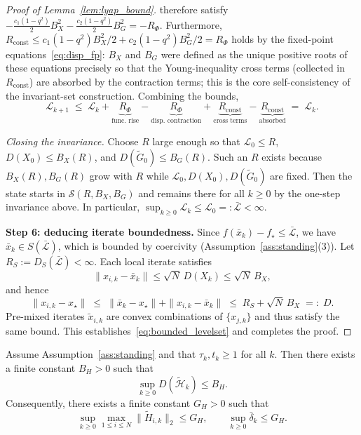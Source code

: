 \documentclass[review,onefignum,onetabnum]{siamart171218}
\begin{document}
\begin{proof}[Proof of Lemma~\ref{lem:lyap_bound}]
therefore satisfy
$-\tfrac{c_1(1{-}q^2)}{2}B_X^2-\tfrac{c_2(1{-}q^2)}{2}B_G^2
=-R_\Phi$.
Furthermore, $R_{\mathrm{const}}\le c_1(1{-}q^2)B_X^2/2+c_2(1{-}q^2)B_G^2/2=R_\Phi$
holds by the fixed-point equations~\eqref{eq:disp_fp}:
$B_X$ and $B_G$ were defined as the unique positive roots of these
equations precisely so that the Young-inequality cross terms (collected
in $R_{\mathrm{const}}$) are absorbed by the contraction terms;
this is the core self-consistency of the invariant-set construction.
Combining the bounds,
\[
  \mathcal L_{k+1}
  \;\le\;
  \mathcal L_k
  +\underbrace{R_\Phi}_{\text{func.\ rise}}
  -\underbrace{R_\Phi}_{\text{disp.\ contraction}}
  +\underbrace{R_{\mathrm{const}}}_{\text{cross terms}}
  -\underbrace{R_{\mathrm{const}}}_{\text{absorbed}}
  \;=\; \mathcal L_k.
\]

\emph{Closing the invariance.}
Choose $R$ large enough so that
$\mathcal L_0\le R$,
$D(X_0)\le B_X(R)$, and
$D(\tilde G_0)\le B_G(R)$.
Such an $R$ exists because $B_X(R),B_G(R)$ grow with $R$
while $\mathcal L_0,D(X_0),D(\tilde G_0)$ are fixed.
Then the state starts in $\mathcal S(R,B_X,B_G)$
and remains there for all $k\ge0$ by the one-step invariance above.
In particular, $\sup_{k\ge0}\mathcal L_k\le \mathcal L_0=:\bar{\mathcal L}<\infty$.

\smallskip
\noindent\textbf{Step 6: deducing iterate boundedness.}
Since $f(\bar x_k)-f_\star\le\bar{\mathcal L}$, we have
$\bar x_k\in S(\bar{\mathcal L})$,
which is bounded by coercivity (Assumption~\ref{ass:standing}(3)).
Let $R_S:=D_S(\bar{\mathcal L})<\infty$.
Each local iterate satisfies
\[
  \|x_{i,k}-\bar x_k\|\le\sqrt{N}\,D(X_k)\le\sqrt{N}\,B_X,
\]
and hence
\[
  \|x_{i,k}-x_\star\|
  \;\le\;
  \|\bar x_k-x_\star\|+\|x_{i,k}-\bar x_k\|
  \;\le\;
  R_S + \sqrt{N}\,B_X
  \;=:\; D.
\]
Pre-mixed iterates $\tilde x_{i,k}$ are convex combinations of
$\{x_{j,k}\}$ and thus satisfy the same bound.
This establishes~\eqref{eq:bounded_levelset} and completes the proof.
\end{proof}

\begin{lemma}\label{lem:tilde_hess_bounded}
Assume Assumption~\ref{ass:standing} and that $\tau_k,t_k\ge 1$ for all $k$.
Then there exists a finite constant $B_H>0$ such that
\[
\sup_{k\ge 0} D(\tilde{\mathcal H}_k)\le B_H.
\]
Consequently, there exists a finite constant $G_H>0$ such that
\[
\sup_{k\ge 0}\max_{1\le i\le N}\big\|\tilde H_{i,k}\big\|_2 \le G_H,
\qquad
\sup_{k\ge 0}\bar\delta_k \le G_H.
\]
\end{lemma}
\end{document}
